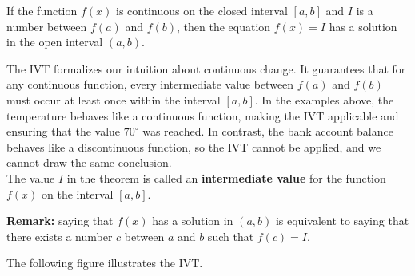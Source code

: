 \documentclass[handout]{ximera}
\begin{document}
\begin{theorem}


If the function $f(x)$ is continuous on the closed interval $[a, b]$ 
and $I$ is a number between $f(a)$ and $f(b)$,
then the equation $f(x) = I$ has a solution in the open interval $(a,b)$. 
\end{theorem}
The IVT formalizes our intuition about continuous change. It guarantees that for any continuous function, 
every intermediate value between \( f(a) \) and \( f(b) \) must occur at least once within the interval \([a, b]\).
In the examples above, the temperature behaves like a continuous function, making the IVT applicable and ensuring that the value \(70^\circ\) was reached. 
In contrast, the bank account balance behaves like a discontinuous function, so the IVT cannot be applied, and we cannot draw the same conclusion.\\
The value $I$ in the theorem is called an \textbf{intermediate value} for the function $f(x)$ 
on the interval $[a,b]$. 

\textbf{Remark:} saying that $f(x)$ has a solution in $(a,b)$ is equivalent to saying that 
there exists a number $c$ between $a$ and $b$ such that $f(c) = I$.

The following figure illustrates the IVT.

\begin{image}
\end{image}
\end{document}
